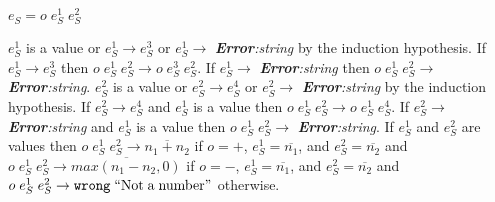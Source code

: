 \begin{case}
$e_{S}=o\;e_{S}^{1}\;e_{S}^{2}$

$e_{S}^{1}$ is a value or $e_{S}^{1}\rightarrow e_{S}^{3}$ or $e_{S}^{1}\rightarrow$ \emph{\textbf{Error}:\;string} by the induction hypothesis.  If $e_{S}^{1}\rightarrow e_{S}^{3}$ then $o\;e_{S}^{1}\;e_{S}^{2}\rightarrow o\;e_{S}^{3}\;e_{S}^{2}$.  If $e_{S}^{1}\rightarrow$ \emph{\textbf{Error}:\;string} then $o\;e_{S}^{1}\;e_{S}^{2}\rightarrow$ \emph{\textbf{Error}:\;string}.  $e_{S}^{2}$ is a value or $e_{S}^{2}\rightarrow e_{S}^{4}$ or $e_{S}^{2}\rightarrow$ \emph{\textbf{Error}:\;string} by the induction hypothesis.  If $e_{S}^{2}\rightarrow e_{S}^{4}$ and $e_{S}^{1}$ is a value then $o\;e_{S}^{1}\;e_{S}^{2}\rightarrow o\;e_{S}^{1}\;e_{S}^{4}$.  If $e_{S}^{2}\rightarrow$ \emph{\textbf{Error}:\;string} and $e_{S}^{1}$ is a value then $o\;e_{S}^{1}\;e_{S}^{2}\rightarrow$ \emph{\textbf{Error}:\;string}.  If $e_{S}^{1}$ and $e_{S}^{2}$ are values then $o\;e_{S}^{1}\;e_{S}^{2}\rightarrow\overline{n_{1}+n_{2}}$ if $o=+$, $e_{S}^{1}=\overline{n_{1}}$, and $e_{S}^{2}=\overline{n_{2}}$ and $o\;e_{S}^{1}\;e_{S}^{2}\rightarrow\overline{max(n_{1}-n_{2},0)}$ if $o=-$, $e_{S}^{1}=\overline{n_{1}}$, and $e_{S}^{2}=\overline{n_{2}}$ and $o\;e_{S}^{1}\;e_{S}^{2}\rightarrow\mathtt{wrong}\;\mathrm{``Not\;a\;number"}$ otherwise.
\end{case}
